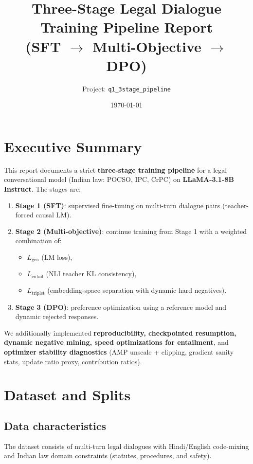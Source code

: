 \documentclass[11pt]{article}
\title{Three-Stage Legal Dialogue Training Pipeline Report\\(SFT $\rightarrow$ Multi-Objective $\rightarrow$ DPO)}
\author{Project: \texttt{q1\_3stage\_pipeline}}
\date{\today}
\begin{document}
\maketitle

\section{Executive Summary}
This report documents a strict \textbf{three-stage training pipeline} for a legal conversational model (Indian law: POCSO, IPC, CrPC) on \textbf{LLaMA-3.1-8B Instruct}. The stages are:
\begin{enumerate}
  \item \textbf{Stage 1 (SFT)}: supervised fine-tuning on multi-turn dialogue pairs (teacher-forced causal LM).
  \item \textbf{Stage 2 (Multi-objective)}: continue training from Stage 1 with a weighted combination of:
  \begin{itemize}
    \item $L_{\text{gen}}$ (LM loss),
    \item $L_{\text{entail}}$ (NLI teacher KL consistency),
    \item $L_{\text{triplet}}$ (embedding-space separation with dynamic hard negatives).
  \end{itemize}
  \item \textbf{Stage 3 (DPO)}: preference optimization using a reference model and dynamic rejected responses.
\end{enumerate}

We additionally implemented \textbf{reproducibility, checkpointed resumption, dynamic negative mining, speed optimizations for entailment}, and \textbf{optimizer stability diagnostics} (AMP unscale + clipping, gradient sanity stats, update ratio proxy, contribution ratios).

\section{Dataset and Splits}
\subsection{Data characteristics}
The dataset consists of multi-turn legal dialogues with Hindi/English code-mixing and Indian law domain constraints (statutes, procedures, and safety).
\end{document}
